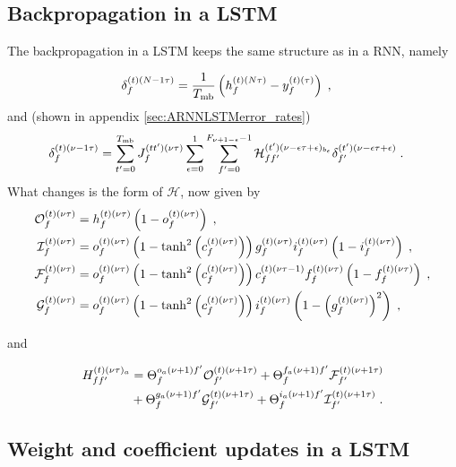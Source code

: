 \subsection{Backpropagation in a LSTM} \label{sec:appendbackproplstm}


The backpropagation in a LSTM keeps the same structure as in a RNN, namely 

\begin{align}
\delta^{(t)(N-1\tau)}_f&= \frac{1}{T_{{\rm mb}}}\left(h_{f}^{(t)(N\tau)}-y_f^{(t)(\tau)}\right)\;,
\end{align}
and (shown in appendix \ref{sec:ARNNLSTMerror_rates})
\begin{align}
\delta^{(t)(\nu-1\tau)}_f&= 
%
\sum_{t'=0}^{T_{{\rm mb}}}J^{(tt')(\nu\tau)}_f\sum_{\epsilon=0}^{1}\sum_{f'=0}^{F_{\nu+1-\epsilon}-1}
%
\mathcal{H}^{(t')(\nu-\epsilon\tau+\epsilon)_{b_\epsilon}}_{ff'}\delta^{(t')(\nu-\epsilon\tau+\epsilon)}_{f'}\;.
\end{align}
What changes is the form of $\mathcal{H}$, now given by
\begin{align}
\mathcal{O}^{(t)(\nu\tau)}_{f}&=h^{(t)(\nu\tau)}_{f}
%
\left(1-o^{(t)(\nu\tau)}_{f}\right)\;,\notag\\
%
\mathcal{I}^{(t)(\nu\tau)}_{f}&=o^{(t)(\nu\tau)}_{f}\left(1-\tanh^2\left(c^{(t)(\nu\tau)}_{f}\right)
%
\right)g^{(t)(\nu\tau)}_{f} i^{(t)(\nu\tau)}_{f}\left(1-i^{(t)(\nu\tau)}_{f}\right)\;,\notag\\
%
\mathcal{F}^{(t)(\nu\tau)}_{f}&=o^{(t)(\nu\tau)}_{f}\left(1-\tanh^2\left(c^{(t)(\nu\tau)}_{f}\right)
%
\right)c^{(t)(\nu\tau-1)}_{f} f^{(t)(\nu\tau)}_{f}\left(1-f^{(t)(\nu\tau)}_{f}\right)\;,\notag\\
%
\mathcal{G}^{(t)(\nu\tau)}_{f}&=o^{(t)(\nu\tau)}_{f}\left(1-\tanh^2\left(c^{(t)(\nu\tau)}_{f}\right)
%
\right)i^{(t)(\nu\tau)}_{f}\left(1-\left(g^{(t)(\nu\tau)}_{f}\right)^2\right)\;,
\end{align}

and

\begin{align}
H^{(t)(\nu\tau)_a}_{ff'}&=\Theta^{o_a(\nu+1)f'}_{f}\mathcal{O}^{(t)(\nu+1\tau)}_{f'}
%
+\Theta^{f_a(\nu+1)f'}_{f}\mathcal{F}^{(t)(\nu+1\tau)}_{f'}\notag\\
%
&+\Theta^{g_a(\nu+1)f'}_{f}\mathcal{G}^{(t)(\nu+1\tau)}_{f'}
%
+\Theta^{i_a(\nu+1)f'}_{f}\mathcal{I}^{(t)(\nu+1\tau)}_{f'}\;.
\end{align}


\subsection{Weight and coefficient updates in a LSTM}

